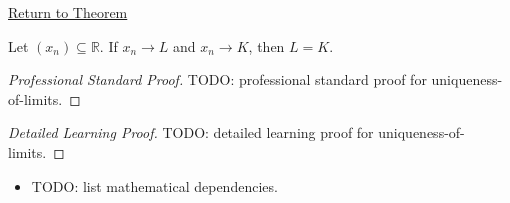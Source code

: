 \newpage
{}
\label{prf:uniqueness-of-limits}

\begin{remark*}[Return]
\hyperref[thm:uniqueness-of-limits]{Return to Theorem}
\end{remark*}

\begin{theorem*}
Let $(x_n) \subseteq \mathbb{R}$. If $x_n \to L$ and $x_n \to K$, then
$L = K$.

\smallskip
\noindent
\end{theorem*}

\begin{proof}[Professional Standard Proof]
\LRAProofBodyStart
TODO: professional standard proof for uniqueness-of-limits.
\end{proof}

\begin{proof}[Detailed Learning Proof]
\LRAProofBodyStart
TODO: detailed learning proof for uniqueness-of-limits.
\end{proof}

\begin{remark*}
\end{remark*}

\begin{dependencies}
\begin{itemize}
  \item TODO: list mathematical dependencies.
\end{itemize}
\end{dependencies}

\clearpage
